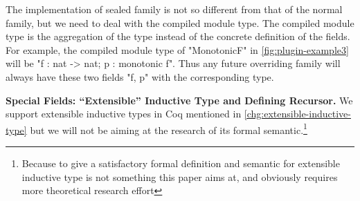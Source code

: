 
The implementation of sealed family is not so different from that of the normal family, but we need to deal with the compiled module type. The compiled module type is the aggregation of the type instead of the concrete definition of the fields.
For example, the compiled module type of
"MonotonicF" in \cref{fig:plugin-example3} will be "{f : nat -> nat; p : monotonic f}". Thus any future overriding family will always have these two fields "f, p" with the corresponding type.






\textbf{Special Fields: ``Extensible'' Inductive Type and Defining Recursor.}
We support extensible inductive types in Coq mentioned in
\ref{chg:extensible-inductive-type} but we will not be aiming at the research of its formal semantic.\footnote{Because to give a satisfactory formal definition and semantic for extensible inductive type is not something this paper aims at, and obviously requires more theoretical research effort}

